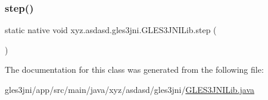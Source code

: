 \subsubsection{\texorpdfstring{step()}{step()}}
{\footnotesize\ttfamily static native void xyz.\+asdasd.\+gles3jni.\+G\+L\+E\+S3\+J\+N\+I\+Lib.\+step (\begin{DoxyParamCaption}{ }\end{DoxyParamCaption})\hspace{0.3cm}{\ttfamily [static]}}



The documentation for this class was generated from the following file\+:\begin{DoxyCompactItemize}
\item 
gles3jni/app/src/main/java/xyz/asdasd/gles3jni/\hyperlink{_g_l_e_s3_j_n_i_lib_8java}{G\+L\+E\+S3\+J\+N\+I\+Lib.\+java}\end{DoxyCompactItemize}

